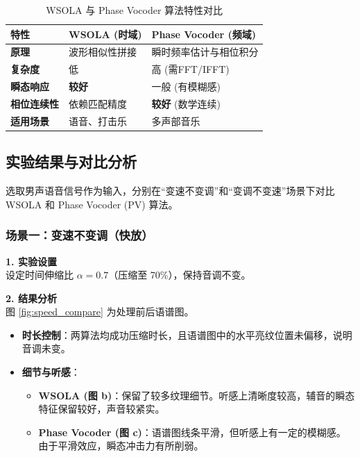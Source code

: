\documentclass[12pt]{ctexart}
\begin{document}
\begin{table}[H]
    \centering
    \caption{WSOLA 与 Phase Vocoder 算法特性对比}
    \begin{tabular}{lll}
        \toprule
        \textbf{特性} & \textbf{WSOLA (时域)} & \textbf{Phase Vocoder (频域)} \\
        \midrule
        \textbf{原理} & 波形相似性拼接 & 瞬时频率估计与相位积分 \\
        \textbf{复杂度} & 低 & 高 (需FFT/IFFT) \\
        \textbf{瞬态响应} & \textbf{较好} & 一般 (有模糊感) \\
        \textbf{相位连续性} & 依赖匹配精度 & \textbf{较好} (数学连续) \\
        \textbf{适用场景} & 语音、打击乐 & 多声部音乐 \\
        \bottomrule
    \end{tabular}
\end{table}

\subsection{实验结果与对比分析}

选取男声语音信号作为输入，分别在“变速不变调”和“变调不变速”场景下对比 WSOLA 和 Phase Vocoder (PV) 算法。

\subsubsection{场景一：变速不变调（快放）}
\textbf{1. 实验设置} \\
设定时间伸缩比 $\alpha = 0.7$（压缩至 70\%），保持音调不变。

\textbf{2. 结果分析} \\
图 \ref{fig:speed_compare} 为处理前后语谱图。
\begin{itemize}
    \item \textbf{时长控制}：两算法均成功压缩时长，且语谱图中的水平亮纹位置未偏移，说明音调未变。
    \item \textbf{细节与听感}：
    \begin{itemize}
        \item \textbf{WSOLA (图 b)}：保留了较多纹理细节。听感上清晰度较高，辅音的瞬态特征保留较好，声音较紧实。
        \item \textbf{Phase Vocoder (图 c)}：语谱图线条平滑，但听感上有一定的模糊感。由于平滑效应，瞬态冲击力有所削弱。
    \end{itemize}
\end{itemize}
\end{document}
